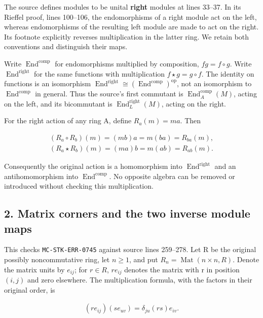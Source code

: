 \documentclass[11pt]{article}
\begin{document}
The source defines modules to be unital \textbf{right} modules at lines 33--37. In its Rieffel proof, lines 100--106, the endomorphisms of a right module act on the left, whereas endomorphisms of the resulting left module are made to act on the right. Its footnote explicitly reverses multiplication in the latter ring. We retain both conventions and distinguish their maps.

Write \(\operatorname{End}^{\mathrm{comp}}\) for endomorphisms multiplied by composition, \(f g = f \circ  g\). Write \(\operatorname{End}^{\mathrm{right}}\) for the same functions with multiplication \(f \star  g = g \circ  f\). The identity on functions is an isomorphism \(\operatorname{End}^{\mathrm{right}} \cong  (\operatorname{End}^{\mathrm{comp}})^{\mathrm{op}}\), not an isomorphism to \(\operatorname{End}^{\mathrm{comp}}\) in general. Thus the source's first commutant is \(\operatorname{End}_{A}^{\mathrm{comp}}(M)\), acting on the left, and its bicommutant is \(\operatorname{End}_{L}^{\mathrm{right}}(M)\), acting on the right.

For the right action of any ring A, define \(R_{a}(m)=ma\). Then

\[\begin{gathered}
(R_{a} \circ R_{b})(m) = (mb)a = m(ba) = R_{ba}(m),\\(R_{a} \star R_{b})(m) = (ma)b = m(ab) = R_{ab}(m).
\end{gathered}\]

Consequently the original action is a homomorphism into \(\operatorname{End}^{\mathrm{right}}\) and an antihomomorphism into \(\operatorname{End}^{\mathrm{comp}}\). No opposite algebra can be removed or introduced without checking this multiplication.

\subsection{2. Matrix corners and the two inverse module maps}\label{matrix-corners-and-the-two-inverse-module-maps}

This checks \texttt{MC-STK-ERR-0745} against source lines 259--278. Let R be the original possibly noncommutative ring, let \(n\geq 1\), and put \(R_{n}=\operatorname{Mat}(n\times n,R)\). Denote the matrix units by \(e_{ij}\); for \(r\in R\), \(r e_{ij}\) denotes the matrix with r in position \((i,j)\) and zero elsewhere. The multiplication formula, with the factors in their original order, is

\[\begin{gathered}
(r e_{ij})(s e_{uv}) = \delta _{ju} (rs)e_{iv}.
\end{gathered}\]
\end{document}
